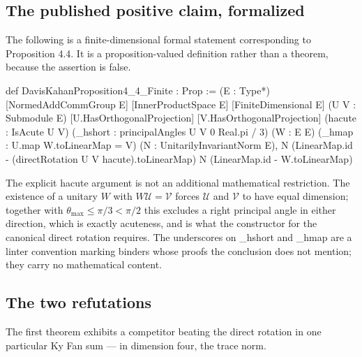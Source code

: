 \documentclass[11pt]{article}
\theoremstyle{definition}
\newcommand{\code}[1]{{\ttfamily\color{kwcode}#1}}
\begin{document}
\subsection{The published positive claim, formalized}

The following is a finite-dimensional formal statement corresponding to
Proposition 4.4.  It is a proposition-valued definition rather than a theorem,
because the assertion is false.

\begin{LeanCode}
def DavisKahanProposition4_4_Finite : Prop :=
  \forall (E : Type*) [NormedAddCommGroup E] [InnerProductSpace \Real E]
    [FiniteDimensional \Real E]
    (U V : Submodule \Real E)
    [U.HasOrthogonalProjection] [V.HasOrthogonalProjection]
    (hacute : IsAcute U V)
    (_hshort : principalAngles U V 0 \le Real.pi / 3)
    (W : E \liso[\Real] E)
    (_hmap : U.map W.toLinearMap = V)
    (N : UnitarilyInvariantNorm \Real E),
      N (LinearMap.id - (directRotation U V hacute).toLinearMap) \le
        N (LinearMap.id - W.toLinearMap)
\end{LeanCode}

The explicit \code{hacute} argument is not an additional mathematical
restriction.  The existence of a unitary $W$ with $W\mathcal U=\mathcal V$
forces $\mathcal U$ and $\mathcal V$ to have equal dimension; together with
$\theta_{\max}\leq\pi/3<\pi/2$ this excludes a right principal angle in either
direction, which is exactly acuteness, and is what the constructor for the
canonical direct rotation requires.  The underscores on \code{\_hshort} and
\code{\_hmap} are a linter convention marking binders whose proofs the
conclusion does not mention; they carry no mathematical content.

\subsection{The two refutations}
\label{sec:leanvalues}

The first theorem exhibits a competitor beating the direct rotation in one
particular Ky Fan sum --- in dimension four, the trace norm.

\end{document}
